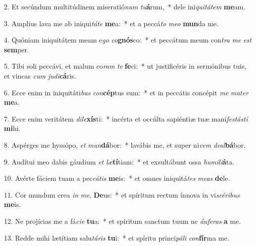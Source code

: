 
2. Et secúndum multitúdinem miseratió\textit{num} \textit{tu}\textbf{á}rum,~* dele ini\textit{qui}\textit{tá}\textit{tem} \textbf{me}am.

3. Amplius lava me ab iniqui\textit{tá}\textit{te} \textbf{me}a:~* et a peccá\textit{to} \textit{me}\textit{o} \textbf{mun}da me.

4. Quóniam iniquitátem meam e\textit{go} \textit{co}\textbf{gnós}co:~* et peccátum meum con\textit{tra} \textit{me} \textit{est} \textbf{sem}per.

5. Tibi soli peccávi, et malum co\textit{ram} \textit{te} \textbf{fe}ci:~* ut justificéris in sermónibus tuis, et vincas \textit{cum} \textit{ju}\textit{di}\textbf{cá}ris.

6. Ecce enim in iniquitáti\textit{bus} \textit{con}\textbf{cép}tus sum:~* et in peccátis concépit \textit{me} \textit{ma}\textit{ter} \textbf{me}a.

7. Ecce enim veritátem \textit{di}\textit{le}\textbf{xís}ti:~* incérta et occúlta sapiéntiæ tuæ mani\textit{fes}\textit{tás}\textit{ti} \textbf{mi}hi.

8. Aspérges me hyssópo, \textit{et} \textit{mun}\textbf{dá}bor:~* lavábis me, et super ni\textit{vem} \textit{de}\textit{al}\textbf{bá}bor.

9. Audítui meo dabis gáudium \textit{et} \textit{læ}\textbf{tí}tiam:~* et exsultábunt ossa \textit{hu}\textit{mi}\textit{li}\textbf{á}ta.

10. Avérte fáciem tuam a pec\textit{cá}\textit{tis} \textbf{me}is:~* et omnes iniquitá\textit{tes} \textit{me}\textit{as} \textbf{de}le.

11. Cor mundum crea \textit{in} \textit{me}, \textbf{De}us:~* et spíritum rectum ínnova in vi\textit{scé}\textit{ri}\textit{bus} \textbf{me}is.

12. Ne projícias me a fá\textit{ci}\textit{e} \textbf{tu}a:~* et spíritum sanctum tuum ne \textit{áu}\textit{fe}\textit{ras} \textbf{a} me.

13. Redde mihi lætítiam salu\textit{tá}\textit{ris} \textbf{tu}i:~* et spíritu princi\textit{pá}\textit{li} \textit{con}\textbf{fír}ma me.

